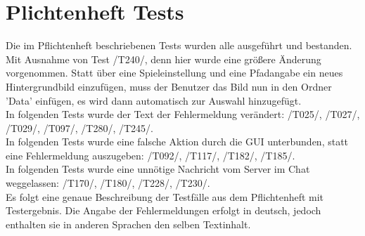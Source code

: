 \documentclass[a4paper]{article}
\begin{document}
	
\section{Plichtenheft Tests}
Die im Pflichtenheft beschriebenen Tests wurden alle ausgeführt und bestanden. Mit Ausnahme von Test /T240/, denn hier wurde eine größere Änderung vorgenommen. Statt über eine Spieleinstellung und eine Pfadangabe ein neues Hintergrundbild einzufügen, muss der Benutzer das Bild nun in den Ordner 'Data' einfügen, es wird dann automatisch zur Auswahl hinzugefügt.\\
In folgenden Tests wurde der Text der Fehlermeldung verändert: /T025/, /T027/, /T029/, /T097/, /T280/, /T245/.  \\
In folgenden Tests wurde eine falsche Aktion durch die GUI unterbunden, statt eine Fehlermeldung auszugeben: /T092/, /T117/, /T182/, /T185/.  \\
In folgenden Tests wurde eine unnötige Nachricht vom Server im Chat weggelassen: /T170/, /T180/, /T228/, /T230/.\\
Es folgt eine genaue Beschreibung der Testfälle aus dem Pflichtenheft mit Testergebnis. Die Angabe der Fehlermeldungen erfolgt in deutsch, jedoch enthalten sie in anderen Sprachen den selben Textinhalt.
\end{document}
